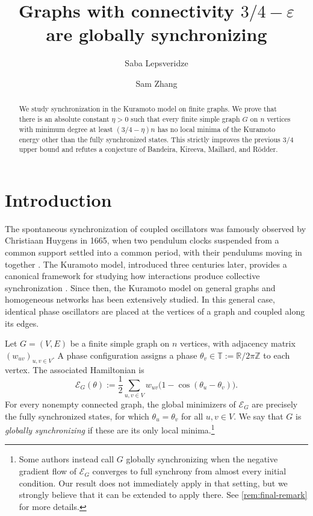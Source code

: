 \documentclass[reqno,11pt]{amsart}
\title{Graphs with connectivity $3/4 - \varepsilon$ are globally synchronizing}
\author{Saba Lepsveridze}
\author{Sam Zhang}
\theoremstyle{definition}
\newcommand{\RR}{\mathbb{R}}
\newcommand{\T}{\mathbb{T}}
\begin{document}
\begin{abstract}
We study synchronization in the Kuramoto model on finite graphs. We prove that there is an absolute constant $\eta>0$ such that every finite simple graph $G$ on $n$ vertices with minimum degree at least $(3/4-\eta)n$ has no local minima of the Kuramoto energy other than the fully synchronized states. This strictly improves the previous $3/4$ upper bound and refutes a conjecture of Bandeira, Kireeva, Maillard, and R\"odder.
\end{abstract}

\maketitle

\section{Introduction}

The spontaneous synchronization of coupled oscillators was famously observed by Christiaan Huygens in 1665, when two pendulum clocks suspended from a common support settled into a common period, with their pendulums moving in together \cite{bennett-huygens-clocks}. The Kuramoto model, introduced three centuries later, provides a canonical framework for studying how interactions produce collective synchronization \cite{kuramoto-75}. Since then, the Kuramoto model on general graphs and homogeneous networks has been extensively studied. In this general case, identical phase oscillators are placed at the vertices of a graph and coupled along its edges.

Let \(G=(V,E)\) be a finite simple graph on \(n\) vertices, with adjacency matrix \((w_{uv})_{u,v\in V}\). A phase configuration assigns a phase \(\theta_v\in\T:=\RR/2\pi\mathbb Z\) to each vertex. The associated Hamiltonian is
\begin{equation}\label{eq:energy}
    \mathcal E_G(\theta)
    :=\frac12\sum_{u,v\in V}w_{uv}
      \bigl(1-\cos(\theta_u-\theta_v)\bigr).
\end{equation}
For every nonempty connected graph, the global minimizers of \(\mathcal E_G\) are precisely the fully synchronized states, for which $\theta_u=\theta_v$ for all $u,v\in V$. We say that \(G\) is \emph{globally synchronizing} if these are its only local minima.\footnote{Some authors instead call \(G\) globally synchronizing when the negative gradient flow of \(\mathcal E_G\) converges to full synchrony from almost every initial condition. Our result does not immediately apply in that setting, but we strongly believe that it can be extended to apply there. See \cref{rem:final-remark} for more details.}
\end{document}
